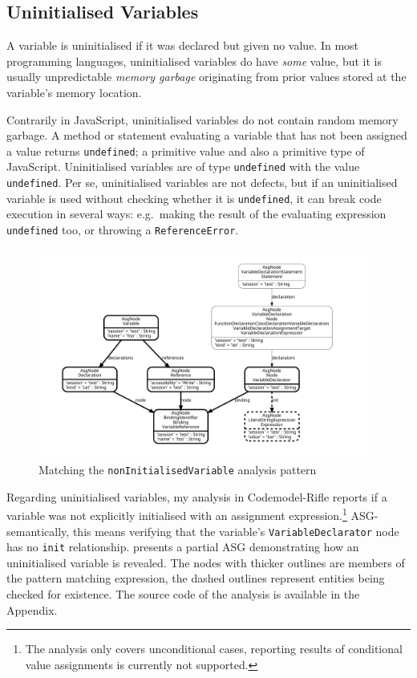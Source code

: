 \subsection{Uninitialised Variables}

A variable is uninitialised if it was declared but given no value. In most programming languages, uninitialised variables do have \emph{some} value, but it is usually unpredictable \emph{memory garbage} originating from prior values stored at the variable's memory location.

Contrarily in JavaScript, uninitialised variables do not contain random memory garbage. A method or statement evaluating a variable that has not been assigned a value returns \lstinline{undefined}; a primitive value and also a primitive type of JavaScript. Uninitialised variables are of type \lstinline{undefined} with the value \lstinline{undefined}. Per se, uninitialised variables are not defects, but if an uninitialised variable is used without checking whether it is \lstinline{undefined}, it can break code execution in several ways: e.g.\ making the result of the evaluating expression \lstinline{undefined} too, or throwing a \lstinline{ReferenceError}.

\begin{figure}[!htb]
	\centering
	\includegraphics[height=69mm, trim=12mm 12mm 12mm 12mm,clip]{figures/analysis_nonInitializedVariable.pdf}
	\caption{Matching the \lstinline{nonInitialisedVariable} analysis pattern}
	\label{fig:analysis-noninitialisedvariable}
\end{figure}

Regarding uninitialised variables, my analysis in Codemodel-Rifle reports if a variable was not explicitly initialised with an assignment expression.\footnote{The analysis only covers unconditional cases, reporting results of conditional value assignments is currently not supported.} ASG-semantically, this means verifying that the variable's \lstinline{VariableDeclarator} node has no \lstinline{init} relationship.  presents a partial ASG demonstrating how an uninitialised variable is revealed. The nodes with thicker outlines are members of the pattern matching expression, the dashed outlines represent entities being checked for existence. The source code of the analysis is available in the Appendix.



